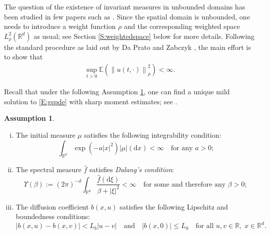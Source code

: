 \documentclass[a4paper,11pt]{article}%
\numberwithin{equation}{section}
\theoremstyle{plain}
\theoremstyle{definition}
\newtheorem{assumptions}[theorem]{Assumption}
\newcommand{\R}{\mathbb{R}}
\newcommand{\E}{\mathbb{E}}
\newcommand{\Norm}[1]{\left\|  #1   \right\|}
\newcommand{\ud}{\ensuremath{ \mathrm{d} }}
\begin{document}
The question of the existence of invariant measures in unbounded domains has been studied in few
papers such as \cite{AM03, MSY15, MSY16,TZ98}. Since the spatial domain is unbounded, one needs to
introduce a weight function $\rho$ and the corresponding weighted space $L_\rho^2(\R^d)$ as usual;
see Section \ref{S:weightedspace} below for more details. Following the standard procedure as laid
out by Da Prato and Zabczyk \cite{DZp92}, the main effort is to show that
\begin{align}
	\label{E:BddMnt}
	\sup_{t>0} \E\left(\Norm{u(t,\cdot)}_\rho^2\right) <\infty.
\end{align}

Recall that under the following Assumption \ref{A:General}, one can find a unique mild solution to
\eqref{E:gspde} with sharp moment estimates; see \cite{CK19,CH19,CD15}.
\begin{assumptions}
	\label{A:General}
	\begin{enumerate}[(i)]
		\item The initial measure $\mu$ satisfies the following integrability condition:
		\begin{equation}
		\int_{\R^d}\exp\left(-a|x|^2\right)|\mu|(\ud x) < \infty \quad \text{for any $a>0$;} \label{A:icon}
		\end{equation}
		\item The spectral measure $\hat{f}$ satisfies {\it Dalang's condition}:
		\begin{equation}
			\label{A:dalcon}
			\Upsilon(\beta) := (2\pi)^{-d}\int_{\R^d}\dfrac{\widehat{f}(\ud \xi)}{\beta + |\xi|^2} < \infty
			\quad \text{for some and therefore any $\beta>0$};
		\end{equation}
		\item The diffusion coefficient $b(x,u)$ satisfies the following Lipschitz and boundedness conditions:
		\begin{equation}
			|b(x,u)-b(x,v)|< L_b |u-v| \quad \text{and} \quad |b(x,0)| \le L_0 \quad \text{for all } u,v \in \R, \; x \in \R^d \label{A:lipcon}.
		\end{equation}
	\end{enumerate}
\end{assumptions}
\end{document}
